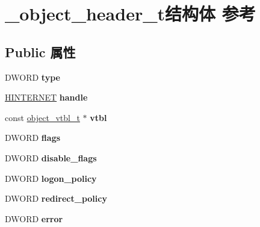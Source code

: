 \hypertarget{struct__object__header__t}{}\section{\+\_\+object\+\_\+header\+\_\+t结构体 参考}
\label{struct__object__header__t}
\subsection*{Public 属性}
\begin{DoxyCompactItemize}
\item 
\mbox{\label{struct__object__header__t_aa84346353cdb76d5db2891df0bf7b9aa}} 
D\+W\+O\+RD {\bfseries type}
\item 
\mbox{\label{struct__object__header__t_a28e07d35fa720fce1fe77cc6e405a84f}} 
\hyperlink{interfacevoid}{H\+I\+N\+T\+E\+R\+N\+ET} {\bfseries handle}
\item 
\mbox{\label{struct__object__header__t_afa9bb59145df791136d16c08790f8a92}} 
const \hyperlink{structobject__vtbl__t}{object\+\_\+vtbl\+\_\+t} $\ast$ {\bfseries vtbl}
\item 
\mbox{\label{struct__object__header__t_aa09bee74046618a05380d1de38021cfd}} 
D\+W\+O\+RD {\bfseries flags}
\item 
\mbox{\label{struct__object__header__t_ace66a7dd5213c8b494b247587a3e48c5}} 
D\+W\+O\+RD {\bfseries disable\+\_\+flags}
\item 
\mbox{\label{struct__object__header__t_ad55393a096db7f135d2a6a1e42a220c5}} 
D\+W\+O\+RD {\bfseries logon\+\_\+policy}
\item 
\mbox{\label{struct__object__header__t_ab12b98f3700a275f81bd35bf1c2c4310}} 
D\+W\+O\+RD {\bfseries redirect\+\_\+policy}
\item 
\mbox{\label{struct__object__header__t_a5ca0500a60a9af89f8d4b630fda1f4b6}} 
D\+W\+O\+RD {\bfseries error}
\item 

\end{DoxyCompactItemize}

